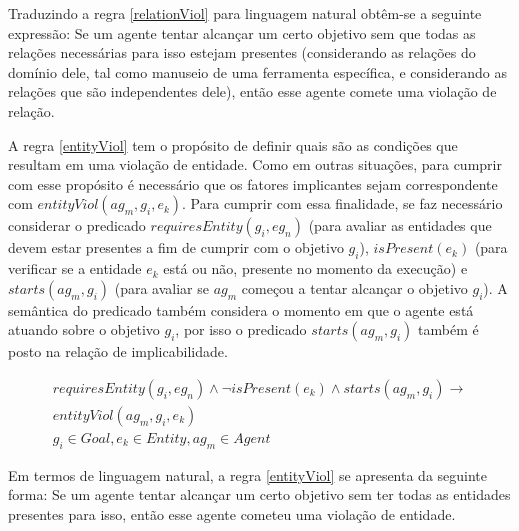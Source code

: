 Traduzindo a regra \ref{relationViol} para linguagem natural obtêm-se a seguinte expressão: Se um agente tentar alcançar um certo objetivo sem que todas as relações necessárias para isso estejam presentes (considerando as relações do domínio dele, tal como manuseio de uma ferramenta específica, e considerando as relações que são independentes dele), então esse agente comete uma violação de relação. 

A regra \ref{entityViol} tem o propósito de definir quais são as condições que resultam em uma violação de entidade. Como em outras situações, para cumprir com esse propósito é necessário que os fatores implicantes sejam correspondente com $entityViol(ag_m,g_i,e_k)$. Para cumprir com essa finalidade, se faz necessário considerar o predicado $requiresEntity(g_i,eg_n)$ (para avaliar as entidades que devem estar presentes a fim de cumprir com o objetivo $g_i$), $isPresent(e_k)$ (para verificar se a entidade $e_k$ está ou não, presente no momento da execução) e $starts(ag_m,g_i)$ (para avaliar se $ag_m$ começou a tentar alcançar o objetivo $g_i$). A semântica do predicado também considera o momento em que o agente está atuando sobre o objetivo $g_i$, por isso o predicado $starts(ag_m,g_i)$ também é posto na relação de implicabilidade.

\begin{eqnarray}\label{entityViol}\nonumber
	requiresEntity(g_i,eg_n) \wedge \neg isPresent(e_k) \wedge starts(ag_m,g_i) \to \nonumber \\ 
    entityViol(ag_m,g_i,e_k)  \nonumber \\  
    g_i \in Goal, e_k \in Entity, ag_m \in Agent
\end{eqnarray}

Em termos de linguagem natural, a regra \ref{entityViol} se apresenta da seguinte forma: Se um agente tentar alcançar um certo objetivo sem ter todas as entidades presentes para isso, então esse agente cometeu uma violação de entidade.

